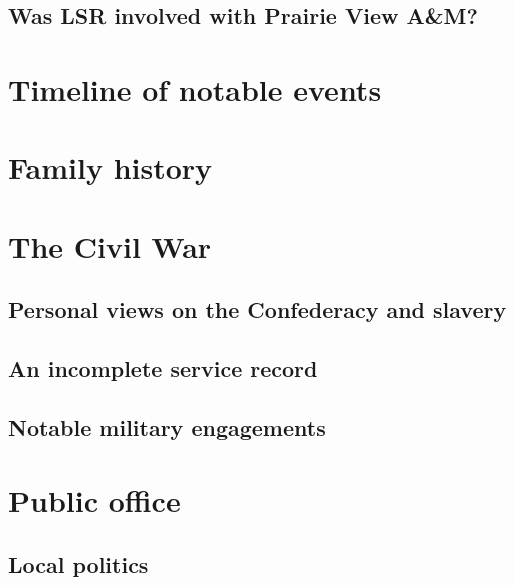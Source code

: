 \documentclass[12pt]{article}
\begin{document}
\subsection{Was LSR involved with Prairie View A\&M?}

\newpage
\section{Timeline of notable events}

\newpage
\section{Family history}

\newpage
\section{The Civil War}

\subsection{Personal views on the Confederacy and slavery}

\subsection{An incomplete service record}

\subsection{Notable military engagements}

\newpage
\section{Public office}

\subsection{Local politics}
\end{document}
